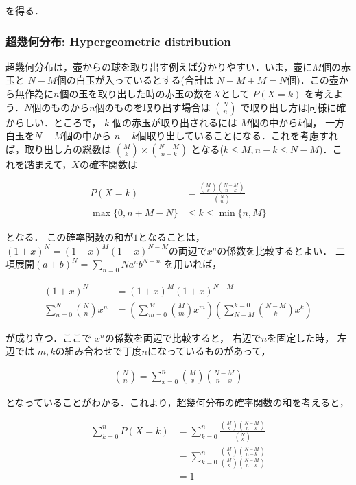\documentclass[12pt,a4j,draft]{jarticle}
\numberwithin{equation}{section}
\theoremstyle{break}
\begin{document}
を得る．

\subsubsection{超幾何分布: Hypergeometric distribution}

超幾何分布は，壺からの球を取り出す例えば分かりやすい．いま，壺に$M$個の赤玉と $N-M$個の白玉が入っているとする(合計は $N-M + M = N$個)．この壺から無作為に$n$個の玉を取り出した時の赤玉の数を$X$として $P(X=k)$ を考えよう．$N$個のものから$n$個のものを取り出す場合は $\displaystyle \binom{N}{n}$ で取り出し方は同様に確からしい．ところで， $k$ 個の赤玉が取り出されるには $M$個の中から$k$個， 一方白玉を$N-M$個の中から $n-k$個取り出していることになる．これを考慮すれば，取り出し方の総数は $\displaystyle \binom{M}{k} \times \binom{N-M}{n-k}$ となる($k \leq M, n-k \leq N-M$)．これを踏まえて，$X$の確率関数は

\begin{align}
    P(X=k) &= \frac{\displaystyle \binom{M}{k} \binom{N-M}{n-k}}{ \displaystyle \binom{N}{n}} \\
    \max \{ 0, n+M-N \} & \leq k \leq \min \{ n, M \}
\end{align}

となる． この確率関数の和が$1$となることは， $(1+x)^{N} = (1+x)^M (1+x)^{N-M}$の両辺で$x^n$の係数を比較するとよい．
二項展開$(a+b)^N = \displaystyle \sum_{n=0}{N} a^n b^{N-n}$ を用いれば，

\begin{align}
    (1+x)^N &= (1+x)^M(1+x)^{N-M} \\
    \sum_{n=0}^{N} \binom{N}{n} x^n &= \left( \sum_{m=0}^{M} \binom{M}{m} x^m \right) \left( \sum_{N-M}^{k=0} \binom{N-M}{k} x^k \right)
\end{align}

が成り立つ．ここで $x^n$の係数を両辺で比較すると， 右辺で$n$を固定した時， 左辺では $m,k$の組み合わせで丁度$n$になっているものがあって，

\begin{align}
    \binom{N}{n} = \sum_{x=0}^{n} \binom{M}{x} \binom{N-M}{n-x}
\end{align}

となっていることがわかる．これより，超幾何分布の確率関数の和を考えると，

\begin{align}
    \sum_{k=0}^{n} P(X=k) &= \sum_{k=0}^{n} \frac{\displaystyle \binom{M}{k} \binom{N-M}{n-k}}{\displaystyle \binom{N}{k}} \\
    &= \sum_{k=0}^{n} \frac{\displaystyle \binom{M}{k} \binom{N-M}{n-k}}{\displaystyle \binom{M}{k} \binom{N-M}{n-k}} \\
    &= 1
\end{align}
\end{document}
